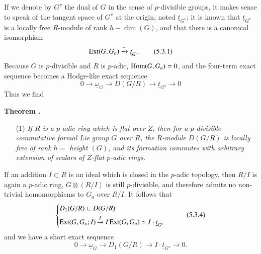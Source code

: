 If we denote by $G^{v}$ the dual of $G$ in the sense of $p$-divisible groups, it makes sense to speak of the tangent space of $G^{v}$ at the origin, noted $\underline{t}_{G^{v}}$; it is known that $\underline{t}_{G^{v}}$ is a locally free $R$-module of rank $h-\dim (G)$, and that there is a canonical isomorphism
\begin{equation*}
\operatorname{Ext}(G,G_{a})\xrightarrow{\sim}\underline{t}_{G^{v}}.\tag{5.3.1}\label{art6-eq5.3.1}
\end{equation*}
Because $G$ is $p$-divisible and $R$ is $p$-adic, $\operatorname{Hom}(G,G_{a})=0$, and the four-term exact sequence becomes a Hodge-like exact sequence
\begin{equation*}
0\to \underline{\omega}_{G}\to D(G/R)\to \underline{t}_{G^{v}}\to 0\tag{5.3.2}\label{art6-eq5.3.2}
\end{equation*}
Thus we find

\medskip
\noindent
{\bf Theorem .\label{art6-thm5.3.3}}
\begin{itemize}
\item[(1)] {\em If $R$ is a $p$-adic ring which is flat over $Z$, then for a $p$-divisible commutative formal Lie group $G$ over $R$, the $R$-module $D(G/R)$ is locally free of rank $h=$ height $(G)$, and its formation commutes with arbitrary extension of scalars of $Z$-flat $p$-adic rings.}
\end{itemize}

If an addition $I\subset R$ is an ideal which is closed in the $p$-adic topology, then $R/I$ is again a $p$-adic ring, $G\otimes (R/I)$ is still $p$-divisible, and therefore admits no non-trivial homomorphisms to $G_{a}$ over $R/I$. It follows that 
\begin{equation*}
\begin{cases}
D_{1}(G/R)\subset D(G/R)\\[3pt]
\operatorname{Ext}(G,G_{a};I)\xrightarrow{I}I \operatorname{Ext}(G,G_{a})\simeq I\cdot \underline{t}_{G^{v}}
\end{cases}\tag{5.3.4}\label{art6-eq5.3.4}
\end{equation*}
and we have a short exact sequence
\begin{equation*}
0\to \underline{\omega}_{G}\to D_{1}(G/R)\to I\cdot \underline{t}_{G^{v}}\to 0.\tag{5.3.5}\label{art6-eq5.3.5}
\end{equation*}

\setcounter{subsection}{4}
